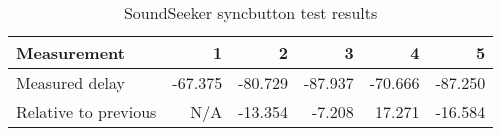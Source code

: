 \begin{table}[]
\centering
\caption{SoundSeeker syncbutton test results}
\label{fig:soundseekersyncbutton}
\begin{tabular}{|l|r|r|r|r|r|}
\hline
Measurement          & 1       & 2       & 3       & 4       & 5       \\ \hline
Measured delay       & -67.375 & -80.729 & -87.937 & -70.666 & -87.250 \\ \hline
Relative to previous & N/A     & -13.354 & -7.208  & 17.271  & -16.584  \\ \hline
\end{tabular}
\end{table}
